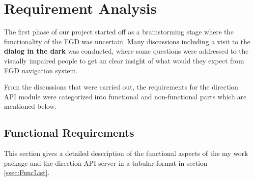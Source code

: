 \newpage
\chapter{Requirement Analysis}
    The first phase of our project started off as a brainstorming stage where the functionality
    of the EGD was uncertain. Many discussions including a visit to the \textbf{dialog in the dark} 
    was conducted, where some questions were addressed to the visually impaired people to get an clear insight
    of what would they expect from EGD navigation system. 
\par
    From the discussions that were carried out, the requirements for the direction API module were
    categorized into functional and non-functional parts which are mentioned below.
    
    \section{Functional Requirements}
        This section gives a detailed description of the functional aspects of the my work package %
        and the direction API server in a tabular format in section \ref{ssec:FuncList}.
